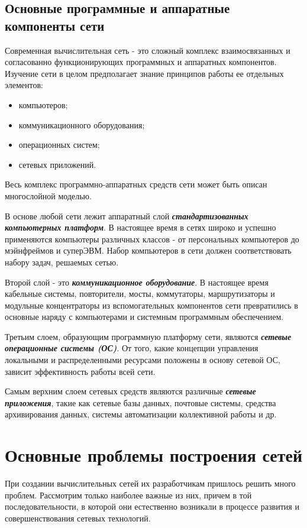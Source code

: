 \subsection{Основные программные и аппаратные компоненты сети}

Современная вычислительная сеть - это сложный комплекс взаимосвязанных и согласованно функционирующих программных и аппаратных компонентов.
Изучение сети в целом предполагает знание принципов работы ее отдельных элементов:
\begin{itemize}
    \item компьютеров;
    \item коммуникационного оборудования;
    \item операционных систем;
    \item сетевых приложений.
\end{itemize}

Весь комплекс программно-аппаратных средств сети может быть описан многослойной моделью.

В основе любой сети лежит аппаратный слой \textbf{\textit{стандартизованных компьютерных платформ}}.
В настоящее время в сетях широко и успешно применяются компьютеры различных классов - от персональных компьютеров до мэйнфреймов и суперЭВМ.
Набор компьютеров в сети должен соответствовать набору задач, решаемых сетью.

Второй слой - это \textbf{\textit{коммуникационное оборудование}}. В настоящее время кабельные системы, повторители, мосты, коммутаторы, маршрутизаторы и модульные концентраторы из вспомогательных компонентов сети превратились в основные наряду с компьютерами и системным программным обеспечением.

Третьим слоем, образующим программную платформу сети, являются \textbf{\textit{сетевые операционные системы (ОС)}}. От того, какие концепции управления локальными и распределенными ресурсами положены в основу сетевой ОС, зависит эффективность работы всей сети.

Самым верхним слоем сетевых средств являются различные \textbf{\textit{сетевые приложения}}, такие как сетевые базы данных, почтовые системы, средства архивирования данных, системы автоматизации коллективной работы и др.

\section{Основные проблемы построения сетей}
При создании вычислительных сетей их разработчикам пришлось решить много проблем.
Рассмотрим только наиболее важные из них, причем в той последовательности, в которой они естественно возникали в процессе развития и совершенствования сетевых технологий.

